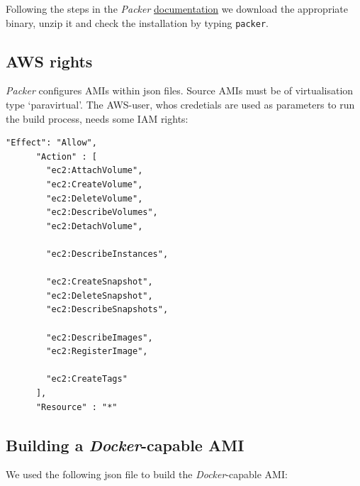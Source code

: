 \documentclass[captions=tableheading]{article}
\begin{document}
Following the steps in the \emph{Packer}  \href{http://www.packer.io/intro/getting-started/setup.html}{documentation} we download the appropriate binary, unzip it and check the installation by typing \texttt{packer}.
\subsection{AWS rights}
\label{sec-7-2}

\emph{Packer} configures AMIs within json files. Source AMIs must be of virtualisation type `paravirtual'.  The AWS-user, whos credetials are used as parameters to run the build process, needs some IAM rights:

\begin{verbatim}
"Effect": "Allow",
      "Action" : [
        "ec2:AttachVolume",
        "ec2:CreateVolume",
        "ec2:DeleteVolume",
        "ec2:DescribeVolumes",
        "ec2:DetachVolume",

        "ec2:DescribeInstances",

        "ec2:CreateSnapshot",
        "ec2:DeleteSnapshot",
        "ec2:DescribeSnapshots",

        "ec2:DescribeImages",
        "ec2:RegisterImage",

        "ec2:CreateTags"
      ],
      "Resource" : "*"
\end{verbatim}
\subsection{Building a \emph{Docker}-capable AMI}
\label{sec-7-3}

We used the following json file to build the \emph{Docker}-capable AMI:
\end{document}
